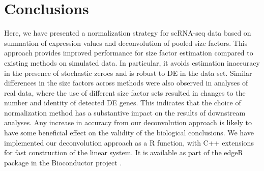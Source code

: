 \documentclass{article}
\begin{document}
\section{Conclusions}
Here, we have presented a normalization strategy for scRNA-seq data based on summation of expression values and deconvolution of pooled size factors.
This approach provides improved performance for size factor estimation compared to existing methods on simulated data.
In particular, it avoids estimation inaccuracy in the presence of stochastic zeroes and is robust to DE in the data set.
Similar differences in the size factors across methods were also observed in analyses of real data,
    where the use of different size factor sets resulted in changes to the number and identity of detected DE genes.
This indicates that the choice of normalization method has a substantive impact on the results of downstream analyses.
Any increase in accuracy from our deconvolution approach is likely to have some beneficial effect on the validity of the biological conclusions.
We have implemented our deconvolution approach as a R function, with C++ extensions for fast construction of the linear system.
It is available as part of the edgeR package in the Bioconductor project \cite{huber2015orchestrating}.



\end{document}
